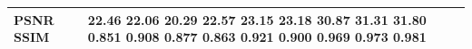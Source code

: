 \begin{tabular}{ll}
\toprule
PSNR SSIM & 22.46 22.06 20.29 22.57 23.15 23.18 30.87 31.31 31.80 0.851 0.908 0.877 0.863 0.921 0.900 0.969 0.973 0.981 \\
\midrule
\bottomrule
\end{tabular}
